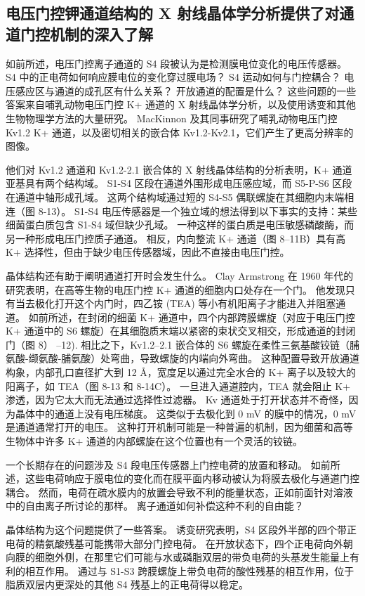\subsection{电压门控钾通道结构的 X 射线晶体学分析提供了对通道门控机制的深入了解}

如前所述，电压门控离子通道的 S4 段被认为是检测膜电位变化的电压传感器。 S4 中的正电荷如何响应膜电位的变化穿过膜电场？ S4 运动如何与门控耦合？ 电压感应区与通道的成孔区有什么关系？ 开放通道的配置是什么？ 这些问题的一些答案来自哺乳动物电压门控 K+ 通道的 X 射线晶体学分析，以及使用诱变和其他生物物理学方法的大量研究。 MacKinnon 及其同事研究了哺乳动物电压门控 Kv1.2 K+ 通道，以及密切相关的嵌合体 Kv1.2-Kv2.1，它们产生了更高分辨率的图像。

他们对 Kv1.2 通道和 Kv1.2-2.1 嵌合体的 X 射线晶体结构的分析表明，K+ 通道亚基具有两个结构域。 S1-S4 区段在通道外围形成电压感应域，而 S5-P-S6 区段在通道中轴形成孔域。 这两个结构域通过短的 S4-S5 偶联螺旋在其细胞内末端相连（图 8-13）。 S1-S4 电压传感器是一个独立域的想法得到以下事实的支持：某些细菌蛋白质包含 S1-S4 域但缺少孔域。 一种这样的蛋白质是电压敏感磷酸酶，而另一种形成电压门控质子通道。 相反，内向整流 K+ 通道（图 8–11B）具有高 K+ 选择性，但由于缺少电压传感器域，因此不直接由电压门控。

晶体结构还有助于阐明通道打开时会发生什么。 Clay Armstrong 在 1960 年代的研究表明，在高等生物的电压门控 K+ 通道的细胞内口处存在一个门。 他发现只有当去极化打开这个内门时，四乙铵 (TEA) 等小有机阳离子才能进入并阻塞通道。 如前所述，在封闭的细菌 K+ 通道中，四个内部跨膜螺旋（对应于电压门控 K+ 通道中的 S6 螺旋）在其细胞质末端以紧密的束状交叉相交，形成通道的封闭门（图 8） –12). 相比之下，Kv1.2–2.1 嵌合体的 S6 螺旋在柔性三氨基酸铰链（脯氨酸-缬氨酸-脯氨酸）处弯曲，导致螺旋的内端向外弯曲。 这种配置导致开放通道构象，内部孔口直径扩大到 12 Å，宽度足以通过完全水合的 K+ 离子以及较大的阳离子，如 TEA（图 8-13 和 8-14C）。 一旦进入通道腔内，TEA 就会阻止 K+ 渗透，因为它太大而无法通过选择性过滤器。 Kv 通道处于打开状态并不奇怪，因为晶体中的通道上没有电压梯度。 这类似于去极化到 0 mV 的膜中的情况，0 mV 是通道通常打开的电压。 这种打开机制可能是一种普遍的机制，因为细菌和高等生物体中许多 K+ 通道的内部螺旋在这个位置也有一个灵活的铰链。

一个长期存在的问题涉及 S4 段电压传感器上门控电荷的放置和移动。 如前所述，这些电荷响应于膜电位的变化而在膜平面内移动被认为将膜去极化与通道门控耦合。 然而，电荷在疏水膜内的放置会导致不利的能量状态，正如前面针对溶液中的自由离子所讨论的那样。 离子通道如何补偿这种不利的自由能？

晶体结构为这个问题提供了一些答案。 诱变研究表明，S4 区段外半部的四个带正电荷的精氨酸残基可能携带大部分门控电荷。 在开放状态下，四个正电荷向外朝向膜的细胞外侧，在那里它们可能与水或磷脂双层的带负电荷的头基发生能量上有利的相互作用。 通过与 S1-S3 跨膜螺旋上带负电荷的酸性残基的相互作用，位于脂质双层内更深处的其他 S4 残基上的正电荷得以稳定。

